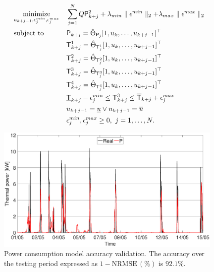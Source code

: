 \begin{problem}\label{P:dpcRealCase}
	\begin{align}
		\begin{aligned}
		& \underset{u_{k+j-1},\epsilon_j^{min},\epsilon_j^{max}}{\mathrm{minimize}} & & \sum_{j=1}^{N} Q{\mathsf{P}}_{k+j}^2 + \lambda_{min}\parallel\epsilon^{min}\parallel_2 + \lambda_{max}\parallel\epsilon^{max}\parallel_2                            \\
		& \mathrm{subject\ to } & & \mathsf{P}_{k+j}   = \hat{\Theta}_{\mathsf{P}_j}   [ 1,u_k,\ldots,u_{k+j-1} ]^\top                         \\
		&                    & & \mathsf{T}^1_{k+j} = \hat{\Theta}_{\mathsf{T}^1_j} [ 1,u_k,\ldots,u_{k+j-1} ]^\top                            \\
		&                    & & \mathsf{T}^2_{k+j} = \hat{\Theta}_{\mathsf{T}^2_j} [ 1,u_k,\ldots,u_{k+j-1} ]^\top                            \\
		&                    & & \mathsf{T}^3_{k+j} = \hat{\Theta}_{\mathsf{T}^3_j} [ 1,u_k,\ldots,u_{k+j-1} ]^\top                            \\
		&                    & & \mathsf{T}^4_{k+j} = \hat{\Theta}_{\mathsf{T}^4_j} [ 1,u_k,\ldots,u_{k+j-1} ]^\top                            \\
		&                    & & \underline{\mathsf{T}}_{k+j}-\epsilon^{min}_j\leq\mathsf{T}^3_{k+j}\leq\overline{\mathsf{T}}_{k+j}+\epsilon^{max}_j  \\
		&                    & & u_{k+j-1}   = \underline{u} \lor u_{k+j-1} = \overline{u}                                       \\
		&                    & & \epsilon^{min}_j,\epsilon^{max}_j \geq 0, \ j = 1,\dots,N.
		\end{aligned}
	\end{align}\label{E:DPCrealcase}
\end{problem}

\begin{figure}[t!]
	\begin{center}
		\includegraphics[width=26pc]{figures/power_testing.eps}
		\caption{Power consumption model accuracy validation. The accuracy over the testing period expressed as $\mathrm{1-NRMSE}\,(\%)$ is $92.1\%$.}
		\label{F:power_testing}			
	\end{center}
\end{figure}

